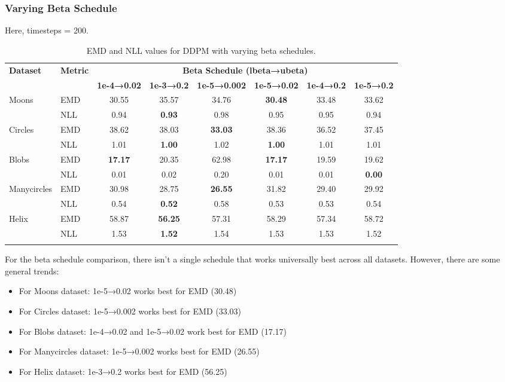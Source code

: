 \documentclass[11pt]{article}
\begin{document}
\subsubsection{Varying Beta Schedule}
Here, timesteps = 200.

\begin{longtable}{|l|l|c|c|c|c|c|c|}
    \hline
     \textbf{Dataset} & \textbf{Metric} & \multicolumn{6}{c|}{\textbf{Beta Schedule (lbeta→ubeta)}} \\
     \cline{3-8}
     & & \textbf{1e-4→0.02} & \textbf{1e-3→0.2} & \textbf{1e-5→0.002} & \textbf{1e-5→0.02} & \textbf{1e-4→0.2} & \textbf{1e-5→0.2} \\
    \hline
        \multirow{2}{*}{Moons} & EMD & 30.55 & 35.57 & 34.76 & \textbf{30.48} & 33.48 & 33.62 \\
        \cline{2-8}
        & NLL & 0.94 & \textbf{0.93} & 0.98 & 0.95 & 0.95 & 0.94 \\
        \hline
        \multirow{2}{*}{Circles} & EMD & 38.62 & 38.03 & \textbf{33.03} & 38.36 & 36.52 & 37.45 \\
        \cline{2-8}
        & NLL & 1.01 & \textbf{1.00} & 1.02 & \textbf{1.00} & 1.01 & 1.01 \\
        \hline
        \multirow{2}{*}{Blobs} & EMD & \textbf{17.17} & 20.35 & 62.98 & \textbf{17.17} & 19.59 & 19.62 \\
        \cline{2-8}
        & NLL & 0.01 & 0.02 & 0.20 & 0.01 & 0.01 & \textbf{0.00} \\
        \hline
        \multirow{2}{*}{Manycircles} & EMD & 30.98 & 28.75 & \textbf{26.55} & 31.82 & 29.40 & 29.92 \\
        \cline{2-8}
        & NLL & 0.54 & \textbf{0.52} & 0.58 & 0.53 & 0.53 & 0.54 \\
        \hline
        \multirow{2}{*}{Helix} & EMD & 58.87 & \textbf{56.25} & 57.31 & 58.29 & 57.34 & 58.72 \\
        \cline{2-8}
        & NLL & 1.53 & \textbf{1.52} & 1.54 & 1.53 & 1.53 & 1.52 \\
        \hline
        \caption{EMD and NLL values for DDPM with varying beta schedules.}
\end{longtable}

For the beta schedule comparison, there isn't a single schedule that works universally best across all datasets. However, there are some general trends:

\begin{itemize}
    \item For Moons dataset: 1e-5→0.02 works best for EMD (30.48)
    \item For Circles dataset: 1e-5→0.002 works best for EMD (33.03)
    \item For Blobs dataset: 1e-4→0.02 and 1e-5→0.02 work best for EMD (17.17)
    \item For Manycircles dataset: 1e-5→0.002 works best for EMD (26.55)
    \item For Helix dataset: 1e-3→0.2 works best for EMD (56.25)
\end{itemize}
\end{document}
